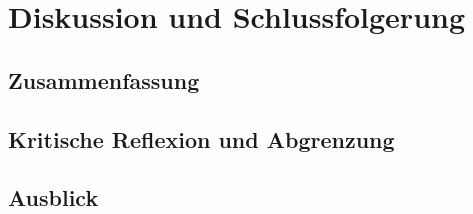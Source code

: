 \section{Diskussion und Schlussfolgerung}
\subsection{Zusammenfassung}
\subsection{Kritische Reflexion und Abgrenzung}
\subsection{Ausblick}